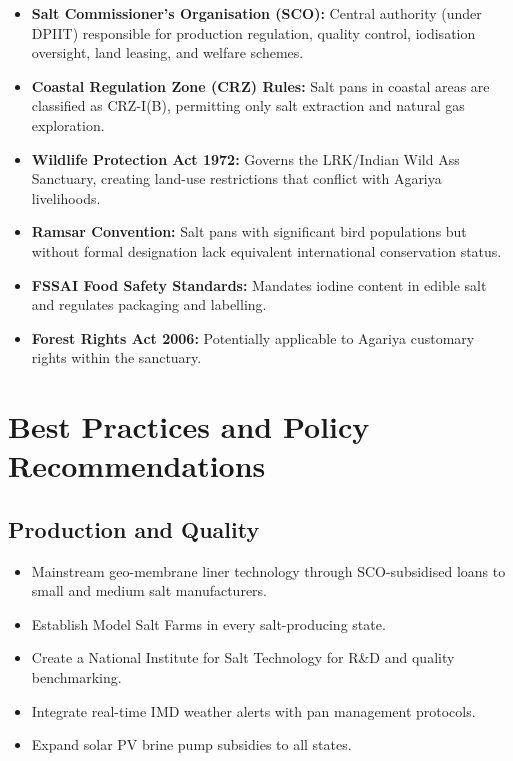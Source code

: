 \documentclass[12pt,a4paper]{article}
\begin{document}
\begin{itemize}[leftmargin=*]
  \item \textbf{Salt Commissioner's Organisation (SCO):} Central authority (under DPIIT)
        responsible for production regulation, quality control, iodisation oversight,
        land leasing, and welfare schemes.
  \item \textbf{Coastal Regulation Zone (CRZ) Rules:} Salt pans in coastal areas are
        classified as CRZ-I(B), permitting only salt extraction and natural gas exploration.
  \item \textbf{Wildlife Protection Act 1972:} Governs the LRK/Indian Wild Ass
        Sanctuary, creating land-use restrictions that conflict with Agariya livelihoods.
  \item \textbf{Ramsar Convention:} Salt pans with significant bird populations but
        without formal designation lack equivalent international conservation status.
  \item \textbf{FSSAI Food Safety Standards:} Mandates iodine content in edible salt
        and regulates packaging and labelling.
  \item \textbf{Forest Rights Act 2006:} Potentially applicable to Agariya customary
        rights within the sanctuary.
\end{itemize}

\section{Best Practices and Policy Recommendations}

\subsection{Production and Quality}

\begin{itemize}[leftmargin=*]
  \item Mainstream geo-membrane liner technology through SCO-subsidised loans to
        small and medium salt manufacturers.
  \item Establish Model Salt Farms in every salt-producing state.
  \item Create a National Institute for Salt Technology for R\&D and quality benchmarking.
  \item Integrate real-time IMD weather alerts with pan management protocols.
  \item Expand solar PV brine pump subsidies to all states.
\end{itemize}
\end{document}
